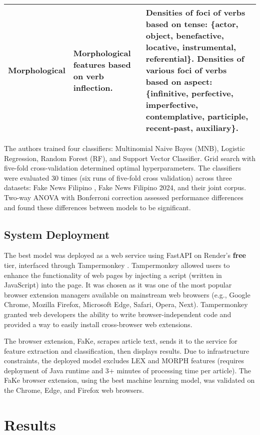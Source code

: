 \documentclass[conference]{IEEEtran}
\begin{document}
\begin{table*}[!t]
\begin{tabular}{|p{}|p{}|p{}|}
Morphological & Morphological features based on verb inflection. & Densities of foci of verbs based on tense: \{actor, object, benefactive, locative, instrumental, referential\}. Densities of various foci of verbs based on aspect: \{infinitive, perfective, imperfective, contemplative, participle, recent-past, auxiliary\}. \\ \hline

\end{tabular}
\end{table*}

The authors trained four classifiers: Multinomial Naive Bayes (MNB), Logistic Regression, Random Forest (RF), and Support Vector Classifier. Grid search with five-fold cross-validation determined optimal hyperparameters. The classifiers were evaluated 30 times (six runs of five-fold cross validation) across three datasets: Fake News Filipino \cite{b3}, Fake News Filipino 2024, and their joint corpus. Two-way ANOVA with Bonferroni correction assessed performance differences and found these differences between models to be significant.

\subsection{System Deployment}
The best model was deployed as a web service using FastAPI on Render's \cite{b15} \textbf{free} tier, interfaced through Tampermonkey \cite{b16}. Tampermonkey allowed users to enhance the functionality of web pages by injecting a script (written in JavaScript) into the page. It was chosen as it was one of the most popular browser extension managers available on mainstream web browsers (e.g., Google Chrome, Mozilla Firefox, Microsoft Edge, Safari, Opera, Next). Tampermonkey granted web developers the ability to write browser-independent code and provided a way to easily install cross-browser web extensions.

The browser extension, FaKe, scrapes article text, sends it to the service for feature extraction and classification, then displays results. Due to infrastructure constraints, the deployed model excludes LEX and MORPH features (requires deployment of Java runtime and 3+ minutes of processing time per article). The FaKe browser extension, using the best machine learning model, was validated on the Chrome, Edge, and Firefox web browsers.

\section{Results}
\end{document}
